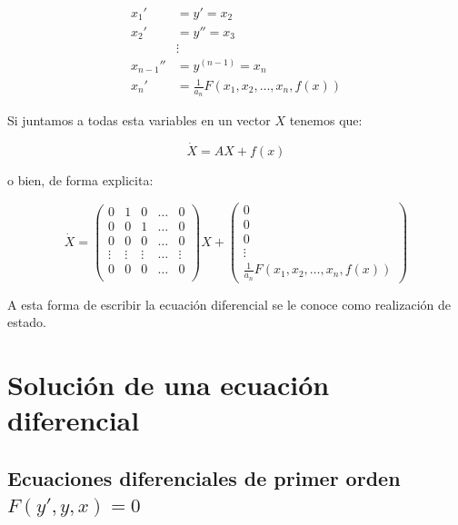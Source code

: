 \begin{definicion}
		\begin{align}
			x_1' &= y' = x_2 \nonumber\\
			x_2' &= y'' = x_3 \nonumber\\
			& \vdots \nonumber\\
			x_{n-1}'' &= y^{(n-1)} = x_n \nonumber\\
			x_n' &= \frac{1}{a_n} F(x_1, x_2, \dots, x_n, f(x))
		\end{align}

		Si juntamos a todas esta variables en un vector $X$ tenemos que:

		\begin{equation*}
			\dot{X} = A X + f(x)
		\end{equation*}

		o bien, de forma explicita:

		\begin{equation}
			\dot{X} =
			\begin{pmatrix}
				0 & 1 & 0 & \dots & 0 \\
				0 & 0 & 1 & \dots & 0 \\
				0 & 0 & 0 & \dots & 0 \\
				\vdots & \vdots & \vdots & \dots & \vdots \\
				0 & 0 & 0 & \dots & 0 \\
			\end{pmatrix} X +
			\begin{pmatrix}
				0 \\
				0 \\
				0 \\
				\vdots \\
				\frac{1}{a_n} F(x_1, x_2, \dots, x_n, f(x))
			\end{pmatrix}
		\end{equation}

		A esta forma de escribir la ecuación diferencial se le conoce como realización de estado.
	\end{definicion}

\newpage
\section{Solución de una ecuación diferencial}
	
	\subsection{Ecuaciones diferenciales de primer orden $F(y', y, x) = 0$}

